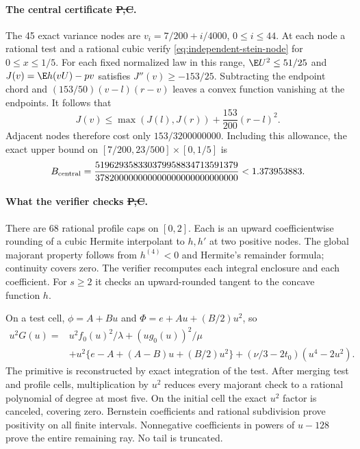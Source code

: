 \paragraph{The central certificate \st{P,C}.}
The 45 exact variance nodes are
$v_i=7/200+i/4000$, $0\le i\le44$.
At each node a rational test and a rational cubic verify
\eqref{eq:independent-stein-node} for $0\le x\le1/5$.
For each fixed normalized law in this range, $\E U^2\le51/25$ and
$J(v)=\E h(vU)-pv$ satisfies $J''(v)\ge-153/25$.
Subtracting the endpoint chord and
$(153/50)(v-l)(r-v)$ leaves a convex function vanishing at the endpoints.
It follows that
\[
 J(v)\le\max(J(l),J(r))+\frac{153}{200}(r-l)^2.
\]
Adjacent nodes therefore cost only $153/3200000000$.
Including this allowance, the exact upper bound on
$[7/200,23/500]\times[0,1/5]$ is
\[
 B_{\rm central}=
 \frac{519629358330379958834713591379}
      {378200000000000000000000000000}
 <1.373953883.
\]

\paragraph{What the verifier checks \st{P,C}.}
There are 68 rational profile caps on $[0,2]$. Each is an upward
coefficientwise rounding of a cubic Hermite interpolant to $h,h'$
at two positive nodes. The global majorant property follows from
$h^{(4)}<0$ and Hermite's remainder formula; continuity covers zero.
The verifier recomputes each integral enclosure and each coefficient.
For $s\ge2$ it checks an upward-rounded tangent to the concave function $h$.

On a test cell, $\phi=A+Bu$ and $\Phi=e+Au+(B/2)u^2$, so
\begin{align*}
 u^2G(u)={}&u^2f_0(u)^2/\lambda+(ug_0(u))^2/\mu\\
 &+u^2\{e-A+(A-B)u+(B/2)u^2\}
       +(\nu/3-2t_0)(u^4-2u^2).
\end{align*}
The primitive is reconstructed by exact integration of the test.
After merging test and profile cells, multiplication by $u^2$ reduces
every majorant check to a rational polynomial of degree at most five.
On the initial cell the exact $u^2$ factor is canceled, covering zero.
Bernstein coefficients and rational subdivision prove positivity on
all finite intervals. Nonnegative coefficients in powers of $u-128$
prove the entire remaining ray. No tail is truncated.

